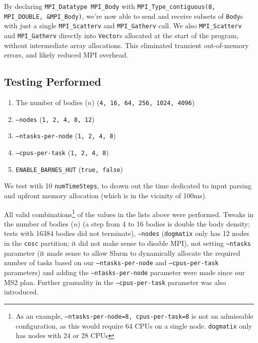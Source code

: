 \documentclass[11pt,a4paper]{article}
\begin{document}
By declaring \texttt{MPI\_Datatype MPI\_Body} with \texttt{MPI\_Type\_contiguous(8, MPI\_DOUBLE, \&MPI\_Body)}, we're now able to send and receive subsets of \texttt{Body}s with just a single \texttt{MPI\_Scatterv} and \texttt{MPI\_Gatherv} call. We also \texttt{MPI\_Scatterv} and \texttt{MPI\_Gatherv} directly into \texttt{Vector}s allocated at the start of the program, without intermediate array allocations. This eliminated transient out-of-memory errors, and likely reduced MPI overhead.


\subsection*{Testing Performed}

\begin{enumerate}
    \item The number of bodies ($n$) (\texttt{4, 16, 64, 256, 1024, 4096})
    \item \texttt{--nodes} (\texttt{1, 2, 4, 8, 12})
    \item \texttt{--ntasks-per-node} (\texttt{1, 2, 4, 8})
    \item \texttt{--cpus-per-task} (\texttt{1, 2, 4, 8})
    \item \texttt{ENABLE\_BARNES\_HUT} (\texttt{true, false})
\end{enumerate}

We test with 10 \texttt{numTimeSteps}, to drown out the time dedicated to input parsing and upfront memory allocation (which is in the vicinity of 100ms). 

All valid combinations\footnote{As an example, \texttt{--ntasks-per-node=8, cpus-per-task=8} is not an admissable configuration, as this would require 64 CPUs on a single node. \texttt{dogmatix} only has nodes with 24 or 28 CPUs} of the values in the lists above were performed. Tweaks in the number of bodies ($n$) (a step from 4 to 16 bodies is double the body density; tests with 16384 bodies did not terminate), \texttt{--nodes} (\texttt{dogmatix} only has 12 nodes in the \texttt{cosc} partition; it did not make sense to disable MPI), not setting \texttt{--ntasks} parameter (it made sense to allow Slurm to dynamically allocate the required number of tasks based on our \texttt{--ntasks-per-node} and \texttt{--cpus-per-task} parameters) and adding the \texttt{--ntasks-per-node} parameter were made since our MS2 plan. Further granuality in the \texttt{--cpus-per-task} parameter was also introduced.
\end{document}
